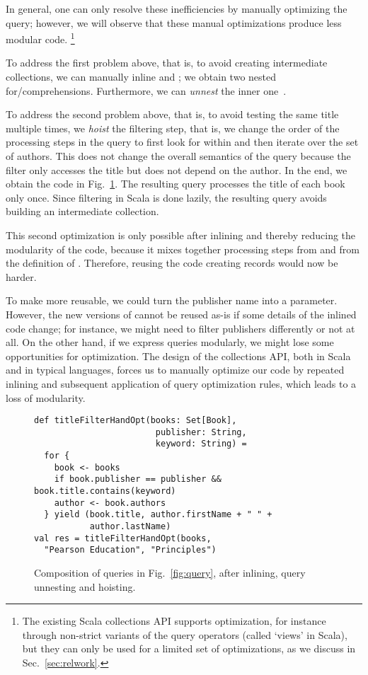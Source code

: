 In general, one can only resolve these inefficiencies by manually optimizing the query; however, we will observe that these manual optimizations produce less modular code.%
\footnote{%
The existing Scala collections API supports optimization, for instance through non-strict variants of the query operators (called `views' in Scala), but they can only
be used for a limited set of optimizations, as we discuss in Sec.~\ref{sec:relwork}.}

To address the first problem above, that is, to avoid creating intermediate collections, we can manually inline  and ; we obtain two nested for\-/comprehensions.
Furthermore, we can \emph{unnest} the inner one~\citep{Fegaras00}.

To address the second problem above, that is, to avoid testing the same title multiple times, we \emph{hoist} the filtering step, that is, we change the order of the processing steps in the query to first look for  within  and then iterate over the set of authors. This does not change the overall semantics of the query because the filter only accesses the title but does not depend on the author. In the end, we obtain the code in Fig.~\ref{fig:titleFilterho2}. The resulting query processes the title of each book only once. Since filtering in Scala is done lazily, the resulting query avoids building an intermediate collection.

This second optimization is only possible after inlining and thereby reducing the modularity of the code, because it mixes together processing steps from  and from the definition of . Therefore, reusing the code creating records would now be harder.

To make  more reusable, we could turn the publisher name into a parameter.
However, the new versions of  cannot be reused as-is if some details of the inlined code change; for instance, we might need to filter publishers differently or not at all. On the other hand, if we express queries modularly, we might lose some opportunities for optimization. The design of the collections API, both in Scala and in typical languages, forces us to manually optimize our code by repeated inlining and subsequent application of query optimization rules, which leads to a loss of modularity.

\begin{figure}
\centering
\begin{lstlisting}
def titleFilterHandOpt(books: Set[Book],
                        publisher: String,
                        keyword: String) =
  for {
    book <- books
    if book.publisher == publisher && book.title.contains(keyword)
    author <- book.authors
  } yield (book.title, author.firstName + " " +
           author.lastName)
val res = titleFilterHandOpt(books,
  "Pearson Education", "Principles")
\end{lstlisting}
\caption{Composition of queries in Fig.~\ref{fig:query}, after inlining, query unnesting and hoisting.}
\label{fig:titleFilterho2}
\end{figure}


